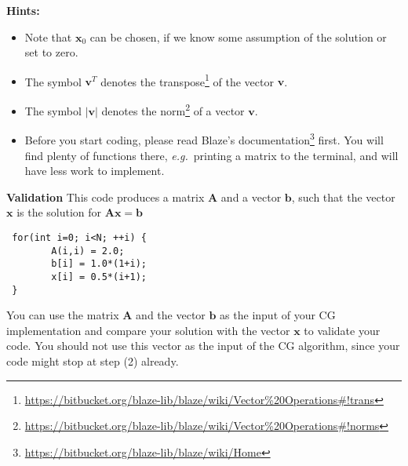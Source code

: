 \documentclass[11pt]{article}
\begin{document}
\begin{enumerate}
\textbf{Hints:}
\begin{itemize}
\item Note that $\mathbf{x}_0$ can be chosen, if we know some assumption of the solution or set to zero.
\item The symbol $\mathbf{v}^T$ denotes the transpose\footnote{\url{https://bitbucket.org/blaze-lib/blaze/wiki/Vector\%20Operations\#!trans}} of the vector $\mathbf{v}$.
\item  The symbol $\vert \mathbf{v} \vert$ denotes the norm\footnote{\url{https://bitbucket.org/blaze-lib/blaze/wiki/Vector\%20Operations\#!norms}} of a vector $\mathbf{v}$.
\item Before you start coding, please read Blaze's documentation\footnote{\url{https://bitbucket.org/blaze-lib/blaze/wiki/Home}} first. You will find plenty of functions there, \emph{e.g.}\ printing a matrix to the terminal, and will have less work to implement.
\end{itemize}

\textbf{Validation}
This code produces a matrix $\mathbf{A}$ and a vector $\mathbf{b}$, such that the vector $\mathbf{x}$ is the solution for  $\mathbf{A} \mathbf{x} = \mathbf{b}$
\begin{lstlisting}
 for(int i=0; i<N; ++i) {
        A(i,i) = 2.0;
        b[i] = 1.0*(1+i);
        x[i] = 0.5*(i+1);
 }
\end{lstlisting}
You can use the matrix $\mathbf{A}$ and the vector $\mathbf{b}$ as the input of your CG implementation and compare your solution with the vector $\mathbf{x}$ to validate your code. You should not use this vector as the input of the CG algorithm, since your code might stop at step (2) already.



\end{enumerate}
\doclicenseThis 
\end{document}
